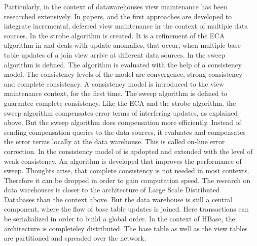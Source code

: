 \documentclass[11pt,a4paper,bibtotoc,idxtotoc,headsepline,footsepline,footexclude,BCOR12mm,DIV13]{scrbook}
\begin{document}
Particularly, in the context of datawarehouses view maintenance has been researched extensively. In papers\cite{wang:efficient}, \cite{agrawal:efficient} and \cite{zhuge:strobe} the first approaches are developed to integrate incremental, deferred view maintenance in the context of multiple data sources. In \cite{zhuge:strobe} the strobe algorithm is created. It is a refinement of the ECA algorithm in \cite{zhuge:view} and deals with update anomalies, that occur, when multiple base table updates of a join view arrive at different data sources. In \cite{agrawal:efficient} the sweep algorithm is defined. The algorithm is evaluated with the help of a consistency model. The consistency levels of the model are convergence, strong consistency and complete consistency. A consistency model is introduced to the view maintenance context, for the first time. The sweep algorithm is defined to guarantee complete consistency. Like the ECA and the strobe algorithm, the sweep algorithm compensates error terms of interfering updates, as explained above. But the sweep algorithm does compensation more efficiently. Instead of sending compensation queries to the data sources, it evaluates and compensates the error terms locally at the data warehouse. This is called on-line error correction. In \cite{wang:efficient} the consistency model of \cite{agrawal:efficient} is apdopted and extended with the level of weak consistency. An algorithm is developed that improves the performance of sweep. Thoughts arise, that complete consistency is not needed in most contexts. Therefore it can be dropped in order to gain computation speed. The research on data warehouses is closer to the architecture of Large Scale Distributed Databases than the context above. But the data warehouse is still a central component, where the flow of base table updates is joined. Here transactions can be serialialized in order to build a global order. In the context of HBase, the architecture is completeley distributed. The base table as well as the view tables are partitioned and spreaded over the network.
\end{document}

